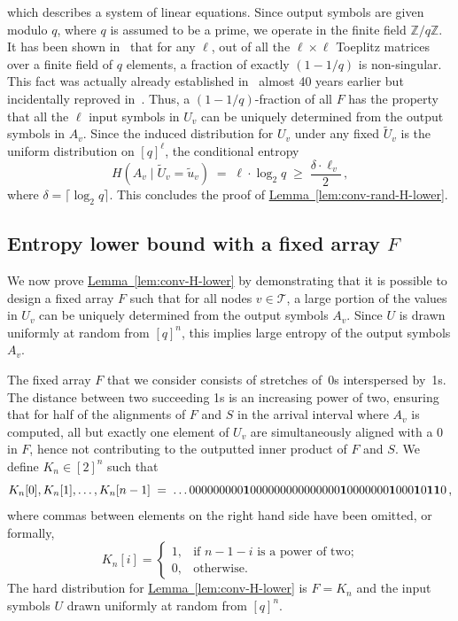 \documentclass[11pt]{article}
\numberwithin{equation}{section}
\theoremstyle{definition}
\theoremstyle{plain}
\newcommand{\expref}[2]{\hyperref[#2]{#1~\ref{#2}}}
\newcommand{\calT}{\ensuremath{\mathcal{T}}}
\newcommand{\Xv}{\ensuremath{U_v}}
\newcommand{\Xvknown}{\ensuremath{\widetilde{U}_v}}
\newcommand{\Xvfix}{\ensuremath{\widetilde{u}_v}}
\newcommand{\Yv}{\ensuremath{A_v}}
\begin{document}
%
which describes a system of linear equations. Since output symbols are given modulo $q$, where $q$ is assumed to be a prime, we operate in the finite field $\mathbb{Z}/q\mathbb{Z}$.
It has been shown in~\cite{KL1996:Toeplitz} that for any $\ell$, out of all the $\ell \times \ell$ Toeplitz matrices over a finite field of $q$ elements, a fraction of exactly $(1-1/q)$ is non-singular.
This fact was actually already established in~\cite{Day1960:Matrices} almost 40 years earlier but incidentally reproved in~\cite{KL1996:Toeplitz}.
%
Thus,
a $(1-1/q)$-fraction of all $F$ has the property that all the $\ell$ input symbols in $\Xv$ can be uniquely determined from the output symbols in $\Yv$.
Since the induced distribution for $\Xv$ under any fixed $\Xvknown$ is the uniform distribution on $[q]^\ell$, the conditional entropy
\[
H(\Yv\mid\Xvknown=\Xvfix)
\;=\;
\ell \cdot \log_2 q
\;\geq\;
\frac{\delta \cdot \ell_v}{2}\,,
\]
where $\delta=\lceil\log_2 q\rceil$.
This concludes the proof of \expref{Lemma}{lem:conv-rand-H-lower}.
%


\subsection{Entropy lower bound with a fixed array \texorpdfstring{$F$}{F}} \label{sec:conv-fixed-F}

We now prove \expref{Lemma}{lem:conv-H-lower} by demonstrating that it is possible to design a fixed array $F$ such that for all nodes $v\in\calT$, a large portion of the values in $\Xv$ can be uniquely determined from the output symbols $\Yv$. Since $U$ is drawn uniformly at random from $[q]^n$, this implies large entropy of the output symbols $\Yv$.

The fixed array $F$ that we consider consists of stretches of~0s interspersed by~1s. The distance between two succeeding 1s is an increasing power of two, ensuring that for half of the alignments of $F$ and $S$ in the arrival interval where $\Yv$ is %
computed, all but exactly one element of $U_v$ are simultaneously aligned with a 0 in $F$, hence not contributing to the outputted inner product of $F$ and $S$. We define $K_n\in[2]^n$ such that
%
\begin{equation*}
K_n[0],K_n[1],\dots,K_n[n-1]\;=\;\dots000000000{\bf 1}000000000000000{\bf 1}0000000{\bf 1}000{\bf 1}0{\bf 11}0\,,
\end{equation*}
where commas between elements on the right hand side have been omitted, or formally,
%
\begin{equation*}
%
K_n[i] =
\begin{cases}
1, &\text{if $n-1-i$ is a power of two;}\\
0, &\text{otherwise.}
\end{cases}
\end{equation*}
%
The hard distribution for \expref{Lemma}{lem:conv-H-lower} is $F=K_n$ and the input symbols $U$ drawn uniformly at random from $[q]^n$.
\end{document}
